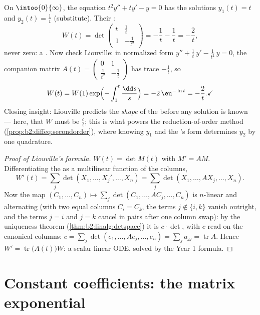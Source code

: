 \begin{example}\label{ex:b2:diffeq:eulerwronskian}
On $\intoo{0}{\infty}$, the equation $t^2y'' + ty' - y = 0$ has
the solutions $y_1(t) = t$ and $y_2(t) = \frac1t$ (substitute).
Their :
\[
W(t) = \det\begin{pmatrix} t & \tfrac1t\\[2pt]
1 & -\tfrac{1}{t^2}\end{pmatrix}
= -\frac1t - \frac1t = -\frac2t ,
\]
never zero: a . Now check Liouville: in
normalized form $y'' + \frac1t\,y' - \frac{1}{t^2}\,y = 0$, the
companion matrix $A(t) = \begin{pmatrix} 0 & 1\\ \frac{1}{t^2}
& -\frac1t\end{pmatrix}$ has trace $-\frac1t$, so
\[
W(t) = W(1)\exp\Bigl(-\int_1^t\frac{\dd s}{s}\Bigr)
= -2\,\eu^{-\ln t} = -\frac2t . \checkmark
\]
Closing insight: Liouville predicts the \emph{shape} of the
 before any solution is known --- here, that $W$ must
be $\frac{c}{t}$; this is what powers the
reduction-of-order method
(\cref{prop:b2:diffeq:secondorder}), where knowing $y_1$ and
the 's form determines $y_2$ by one quadrature.
\end{example}

\begin{proof}[Proof of Liouville's formula]
$W(t) = \det M(t)$ with $M' = AM$. Differentiating the 
as a multilinear function of the columns,
\[
W'(t) = \sum_j \det(X_1, \dots, X_j', \dots, X_n)
= \sum_j \det(X_1, \dots, AX_j, \dots, X_n) .
\]
Now the map $(C_1, \dots, C_n) \mapsto \sum_j \det(C_1, \dots,
AC_j, \dots, C_n)$ is $n$-linear and alternating (with two equal
columns $C_i = C_k$, the terms $j \notin \{i, k\}$ vanish outright,
and the terms $j = i$ and $j = k$ cancel in pairs after one column
swap): by the uniqueness theorem
(\cref{thm:b2:linalg:detspace}) it is $c \cdot \det$, with $c$ read
on the canonical columns: $c = \sum_j \det(e_1, \dots, Ae_j, \dots,
e_n) = \sum_j a_{jj} = \operatorname{tr} A$. Hence $W' =
\operatorname{tr}\bigl(A(t)\bigr)W$: a scalar linear ODE, solved by
the Year 1 formula.
\end{proof}

\section{Constant coefficients: the matrix exponential}

